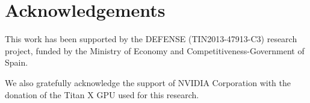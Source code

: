 \documentclass[preprint,authoryear,12pt]{elsarticle}
\begin{document}
\section*{Acknowledgements}
This work has been supported by the DEFENSE (TIN2013-47913-C3) research project, funded by the Ministry of Economy and Competitiveness-Government of Spain.

We also gratefully acknowledge the support of NVIDIA Corporation with the donation of the Titan X GPU used for this research.

%
%


\end{document}
